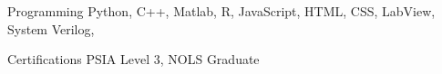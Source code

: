 

\begin{cvskills}

  \cvskill
    {Programming} %
    {Python, C++, Matlab, R, JavaScript, HTML, CSS, LabView, System Verilog, } %

  \cvskill
    {Certifications} %
    {PSIA Level 3, NOLS Graduate} %

\end{cvskills}
